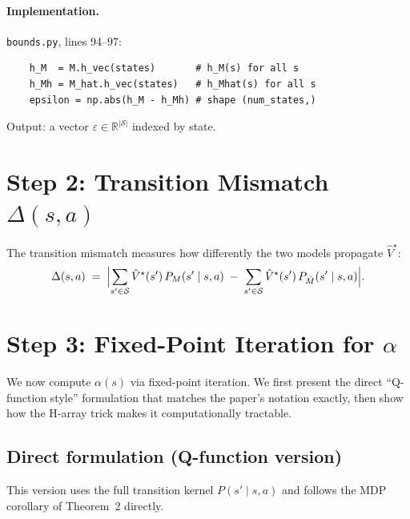 \documentclass[11pt]{article}
\newcommand{\Vhatstar}{\hat V^\star}
\begin{document}
\paragraph{Implementation.}
\texttt{bounds.py}, lines 94--97:
\begin{verbatim}
    h_M  = M.h_vec(states)       # h_M(s) for all s
    h_Mh = M_hat.h_vec(states)   # h_Mhat(s) for all s
    epsilon = np.abs(h_M - h_Mh) # shape (num_states,)
\end{verbatim}
Output: a vector $\varepsilon \in \mathbb{R}^{|\mathcal{S}|}$ indexed by
state.

\section{Step 2: Transition Mismatch $\Delta(s,a)$}

The transition mismatch measures how differently the two models propagate
$\Vhatstar$:
\begin{equation}\label{eq:delta}
  \Delta(s,a)
  \;=\; \Bigl|\sum_{s' \in \mathcal{S}} \Vhatstar(s')\, P_M(s' \mid s, a)
        \;-\; \sum_{s' \in \mathcal{S}} \Vhatstar(s')\, P_{\hat M}(s' \mid s, a)\Bigr|.
\end{equation}

\section{Step 3: Fixed-Point Iteration for $\alpha$}

We now compute $\alpha(s)$ via fixed-point iteration.  We first present the
direct ``Q-function style'' formulation that matches the paper's notation
exactly, then show how the H-array trick makes it computationally tractable.

\subsection{Direct formulation (Q-function version)}
\label{sec:q-version}

This version uses the full transition kernel $P(s' \mid s, a)$ and follows
the MDP corollary of Theorem~2 directly.
\end{document}
